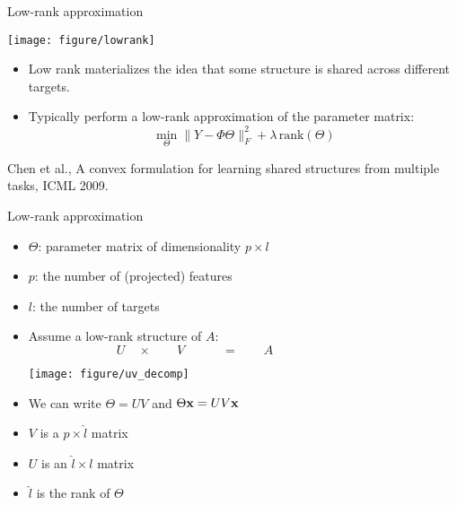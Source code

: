 \documentclass[11pt,compress,t,notes=noshow, xcolor=table]{beamer}
\begin{document}
\begin{frame}{Low-rank approximation}
	
	\begin{center}
		\texttt{[image: figure/lowrank]}
	\end{center}

	\begin{itemize}
		\item Low rank materializes the idea that some structure is shared across different targets.
		\item Typically perform a low-rank approximation of the parameter matrix:
		$$\min_\Theta \|Y - \Phi \Theta \|^2_F + \lambda \, \mathrm{rank}(\Theta)$$
	\end{itemize}
	{\tiny Chen et al., A convex formulation for learning shared structures from
	multiple tasks, ICML 2009.}
\end{frame}

\begin{frame}{Low-rank approximation}
	
	
	\begin{itemize}
		\item $\Theta$: parameter matrix of dimensionality $p \times l$ 
		\item $p$: the number of (projected) features
		\item $l$: the number of targets
		\item Assume a low-rank structure of $A$:\\
		$ \qquad  \qquad\qquad \quad  U  \quad \times \qquad  V \qquad \quad  =  \qquad  A$
		\begin{center}		
			\texttt{[image: figure/uv\_decomp]}
		\end{center}
		
		\item We can write $\Theta=UV$ and $\Theta \mathbf{x} = UV \mathbf{x}$
		\item $V$ is a $p \times \hat{l}$ matrix
		\item  $U$ is an $\hat{l} \times l$ matrix	
		\item $\hat{l}$ is the rank of $\Theta$
	\end{itemize}
	
\end{frame}
\end{document}
